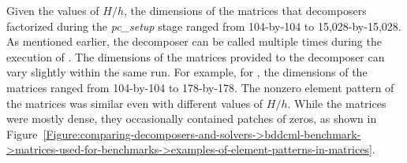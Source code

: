Given the values of $H/h$, the dimensions of the matrices that decomposers factorized during the \textit{pc\_setup} stage ranged from 104-by-104 to 15,028-by-15,028.
As mentioned earlier, the decomposer can be called multiple times during the execution of .
The dimensions of the matrices provided to the decomposer can vary slightly within the same run.
For example, for , the dimensions of the matrices ranged from 104-by-104 to 178-by-178.
The nonzero element pattern of the matrices was similar even with different values of $H/h$.
While the matrices were mostly dense, they occasionally contained patches of zeros, as shown in Figure~\ref{Figure:comparing-decomposers-and-solvers->bddcml-benchmark->matrices-used-for-benchmarks->examples-of-element-patterns-in-matrices}.

